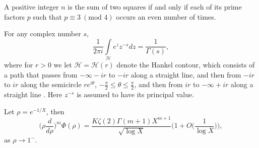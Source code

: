 \documentclass[10pt,a4paper]{amsart}
\begin{document}
\begin{theorem} \label{tst}
    A positive integer $n$ is the sum of two squares if and only if each of its prime factors $p$ such that $p\equiv 3 \ (\text{mod } 4)$ occurs an even number of times.
\end{theorem}

\begin{theorem}[Hankel] \label{H}
    For any complex number $s$,
    \begin{equation*}
        \frac{1}{2\pi i} \int\limits_\mathcal{H} e^zz^{-s} dz= \frac{1}{\Gamma(s)},
    \end{equation*}
    where for $r>0$ we let $\mathcal{H}=\mathcal{H}(r)$ denote the Hankel contour, which consists  of a path that passes from $-\infty-ir$ to $-ir$ along a straight line, and then from $-ir$ to $ir$ along the semicircle $re^{i\theta}$, $-\frac{\pi}{2} \leq \theta \leq \frac{\pi}{2}$, and then from $ir$ to $- \infty +ir $ along a straight line . Here $z^{-s}$ is assumed to have its principal value.
\end{theorem}

\begin{lemma}\label{deriv} Let $\rho=e^{-1/X}$, then
    \begin{equation} 
        \Big(\rho \frac{d}{d\rho}\Big)^m \Phi(\rho)= \frac{K \zeta(2) \Gamma(m+1)X^{m+1}}{\sqrt{\log X}}\Bigg(1+O\Big(\frac{1}{\log X}\Big)\Bigg),
    \end{equation}
    as $\rho \to 1^-$.
\end{lemma}
\end{document}
